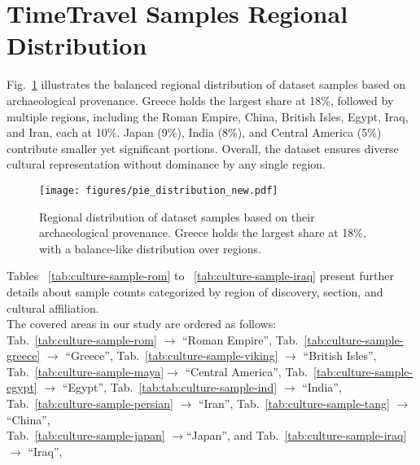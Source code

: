 \documentclass[11pt]{article}
\begin{document}
\section{TimeTravel Samples Regional Distribution}
Fig.~\ref{fig:sample_pie} illustrates the balanced regional distribution of dataset samples based on archaeological provenance. Greece holds the largest share at 18\%, followed by multiple regions, including the Roman Empire, China, British Isles, Egypt, Iraq, and Iran, each at 10\%. Japan (9\%), India (8\%), and Central America (5\%) contribute smaller yet significant portions. Overall, the dataset ensures diverse cultural representation without dominance by any single region.

\begin{figure}[ht]
\centering
  \texttt{[image: figures/pie\_distribution\_new.pdf]}
  \caption{Regional distribution of dataset samples based on their archaeological provenance. Greece holds the largest share at 18\%,  with a balance-like distribution over regions.}
  \label{fig:sample_pie}
\end{figure}


Tables ~\ref{tab:culture-sample-rom} to ~\ref{tab:culture-sample-iraq} present further details about sample counts categorized by region of discovery, section, and cultural affiliation. \\
The covered areas in our study are ordered as follows:\\
Tab.~\ref{tab:culture-sample-rom} $\rightarrow$ ``Roman Empire'', Tab.~\ref{tab:culture-sample-greece} $\rightarrow$ ``Greece'', Tab.~\ref{tab:culture-sample-viking} $\rightarrow$ ``British Isles'', 
Tab.~\ref{tab:culture-sample-maya}$ \rightarrow$ ``Central America'', Tab.~\ref{tab:culture-sample-egypt} $\rightarrow$ ``Egypt'', Tab.~\ref{tab:tab:culture-sample-ind} $\rightarrow$ ``India'', \\
Tab.~\ref{tab:culture-sample-persian} $\rightarrow$ ``Iran'', Tab.~\ref{tab:culture-sample-tang} $\rightarrow$ ``China'', \\Tab.~\ref{tab:culture-sample-japan} $\rightarrow $``Japan'', and Tab.~\ref{tab:culture-sample-iraq} $\rightarrow$ ``Iraq'',
\end{document}
